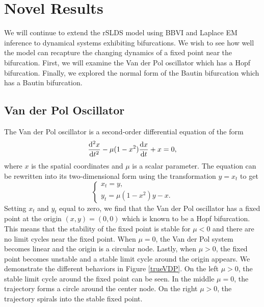 \section{Novel Results}
We will continue to extend the rSLDS model using BBVI and Laplace EM inference to dynamical systems exhibiting bifurcations. We wish to see how well the model can recapture the changing dynamics of a fixed point near the bifurcation. First, we will examine the Van der Pol oscillator which has a Hopf bifurcation. Finally, we explored the normal form of the Bautin bifurcation which has a Bautin bifurcation.  

\subsection{Van der Pol Oscillator}
The Van der Pol oscillator is a second-order differential equation of the form
\begin{equation}
    \frac{{\mathrm{d}}^2 x}{{\mathrm{d}} t^2} - \mu(1 - x^2)\frac{{\mathrm{d}} x}{{\mathrm{d}} t} + x = 0,
\end{equation}
where $x$ is the spatial coordinates and $\mu$ is a scalar parameter. The equation can be rewritten into its two-dimensional form using the transformation $y = x_t$ to get
\begin{equation}
    \begin{cases}
        x_t = y,\\
        y_t = \mu(1-x^2)y - x.
    \end{cases}
\end{equation}
Setting $x_t$ and $y_t$ equal to zero, we find that the Van der Pol oscillator has a fixed point at the origin $(x,y) = (0,0)$ which is known to be a Hopf bifurcation. This means that the stability of the fixed point is stable for $\mu < 0$ and there are no limit cycles near the fixed point. When $\mu = 0$, the Van der Pol system becomes linear and the origin is a circular node. Lastly, when $\mu > 0$, the fixed point becomes unstable and a stable limit cycle around the origin appears. We demonstrate the different behaviors in Figure \ref{trueVDP}. On the left $\mu > 0$, the stable limit cycle around the fixed point can be seen. In the middle $\mu =0$, the trajectory forms a circle around the center node. On the right $\mu > 0$, the trajectory spirals into the stable fixed point. 

